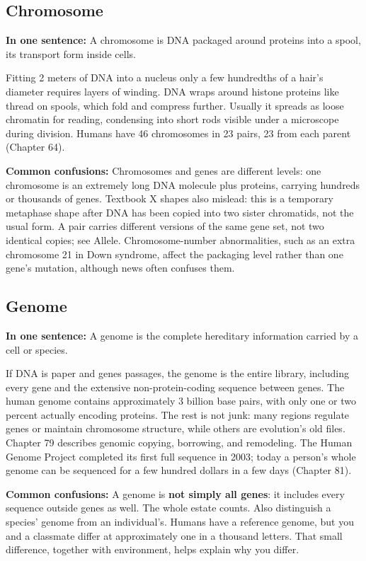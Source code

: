\subsection{Chromosome}

\textbf{In one sentence:} A chromosome is DNA packaged around proteins into a spool, its transport form inside cells.

Fitting 2 meters of DNA into a nucleus only a few hundredths of a hair's diameter requires layers of winding. DNA wraps around histone proteins like thread on spools, which fold and compress further. Usually it spreads as loose chromatin for reading, condensing into short rods visible under a microscope during division. Humans have 46 chromosomes in 23 pairs, 23 from each parent (Chapter 64).

\textbf{Common confusions:} Chromosomes and genes are different levels: one chromosome is an extremely long DNA molecule plus proteins, carrying hundreds or thousands of genes. Textbook X shapes also mislead: this is a temporary metaphase shape after DNA has been copied into two sister chromatids, not the usual form. A pair carries different versions of the same gene set, not two identical copies; see Allele. Chromosome-number abnormalities, such as an extra chromosome 21 in Down syndrome, affect the packaging level rather than one gene's mutation, although news often confuses them.

\subsection{Genome}

\textbf{In one sentence:} A genome is the complete hereditary information carried by a cell or species.

If DNA is paper and genes passages, the genome is the entire library, including every gene and the extensive non-protein-coding sequence between genes. The human genome contains approximately 3 billion base pairs, with only one or two percent actually encoding proteins. The rest is not junk: many regions regulate genes or maintain chromosome structure, while others are evolution's old files. Chapter 79 describes genomic copying, borrowing, and remodeling. The Human Genome Project completed its first full sequence in 2003; today a person's whole genome can be sequenced for a few hundred dollars in a few days (Chapter 81).

\textbf{Common confusions:} A genome is \textbf{not simply all genes}: it includes every sequence outside genes as well. The whole estate counts. Also distinguish a species' genome from an individual's. Humans have a reference genome, but you and a classmate differ at approximately one in a thousand letters. That small difference, together with environment, helps explain why you differ.

